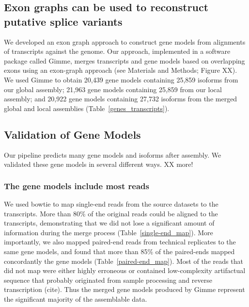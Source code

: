 \documentclass[10pt]{article}
\begin{document}

\subsection*{Exon graphs can be used to reconstruct putative splice variants}

We developed an exon graph approach to construct gene models from
alignments of transcripts against the genome.  Our approach,
implemented in a software package called Gimme, merges transcripts and
gene models based on overlapping exons using an exon-graph approach
(see Materials and Methods; Figure XX).  We used Gimme to obtain
20,439 gene models containing 25,859 isoforms from our global
assembly; 21,963 gene models containing 25,859 from our local
assembly; and 20,922 gene models containing 27,732 isoforms from the
merged global and local assemblies (Table~\ref{genes_transcripts}).


\subsection*{Validation of Gene Models}

Our pipeline predicts many gene models and isoforms after assembly.
We validated these gene models in several different ways.  XX more!

\subsubsection*{The gene models include most reads}

We used bowtie to map single-end reads from the source datasets to the
transcripts.  More than 80\% of the original reads could be aligned to
the transcripts, demonstrating that we did not lose a significant
amount of information during the merge process
(Table~\ref{single-end_map}).  More importantly, we also mapped
paired-end reads from technical replicates to the same gene models,
and found that more than 85\% of the paired-ends mapped concordantly
the gene models (Table~\ref{paired-end_map}).  Most of the reads that
did not map were either highly erroneous or contained low-complexity
artifactual sequence that probably originated from sample processing
and reverse transcription (cite).
Thus the merged gene models produced by Gimme represent the significant
majority of the assemblable data.
\end{document}
